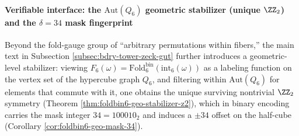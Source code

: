 \paragraph{Verifiable interface: the \texorpdfstring{$\mathrm{Aut}(Q_6)$}{Aut(Q6)} geometric stabilizer (unique \texorpdfstring{$\ZZ_2$}{Z2}) and the \texorpdfstring{$\delta=34$}{delta=34} mask fingerprint}
Beyond the fold-gauge group of ``arbitrary permutations within fibers,'' the main text in Subsection \ref{subsec:bdry-tower-zeck-gut} further introduces a geometric-level stabilizer:
viewing \(F_6(\omega)=\mathrm{Fold}^{\mathrm{bin}}_6(\mathrm{int}_6(\omega))\) as a labeling function on the vertex set of the hypercube graph \(Q_6\), and filtering within \(\mathrm{Aut}(Q_6)\) for elements that commute with it, one obtains the unique surviving nontrivial \(\ZZ_2\) symmetry (Theorem \ref{thm:foldbin6-geo-stabilizer-z2}), which in binary encoding carries the mask integer \(34=100010_2\) and induces a \(\pm 34\) offset on the half-cube (Corollary \ref{cor:foldbin6-geo-mask-34}).
